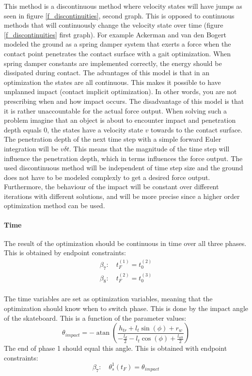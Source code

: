 This method is a discontinuous method where velocity states will have jumps as seen in figure \ref{f_discontinuities}, second graph. This is opposed to continuous methods that will continuously change the velocity state over time (figure \ref{f_discontinuities} first graph). For example Ackerman and van den Bogert \cite{ackermann_optimality_2010} modeled the ground as a spring damper system that exerts a force when the contact point penetrates the contact surface with a gait optimization. When spring damper constants are implemented correctly, the energy should be dissipated during contact. The advantages of this model is that in an optimization the states are all continuous. This makes it possible to have unplanned impact (contact implicit optimization). In other words, you are not prescribing when and how impact occurs. The disadvantage of this model is that it is rather unaccountable for the actual force output. When solving such a problem imagine that an object is about to encounter impact and penetration depth equals 0, the states have a velocity state $v$ towards to the contact surface. The penetration depth of the next time step with a simple forward Euler integration will be $v \delta t$. This means that the magnitude of the time step will influence the penetration depth, which in terms influences the force output. The used discontinuous method will be independent of time step size and the ground does not have to be modeled complexly to get a desired force output. Furthermore, the behaviour of the impact will be constant over different iterations with different solutions, and will be more precise since a higher order optimization method can be used. 

\paragraph{Time}
\noindent The result of the optimization should be continuous in time over all three phases. This is obtained by endpoint constraints: 
\begin{equation}
    \begin{array}{c}
         \beta_7: \quad t_F^{(1)} = t_0^{(2)}  \\
         \beta_8: \quad t_F^{(2)} = t_0^{(3)}  \\
    \end{array}
\end{equation}

The time variables are set as optimization variables, meaning that the optimization should know when to switch phase. This is done by the impact angle of the skateboard. This is a function of the parameter values:
\begin{equation}
    \theta_{impact} = -\operatorname{atan}\left(\frac{h_{t r}+l_t \sin (\phi)+r_w}{-\frac{l_d}{2}-l_t \cos (\phi)+\frac{l_{w b}}{2}}\right)
\end{equation}
The end of phase 1 should equal this angle. This is obtained with endpoint constraints:
\begin{equation}
    \beta_7: \quad \theta_s^{1}(t_F) = \theta_{impact}
\end{equation}

